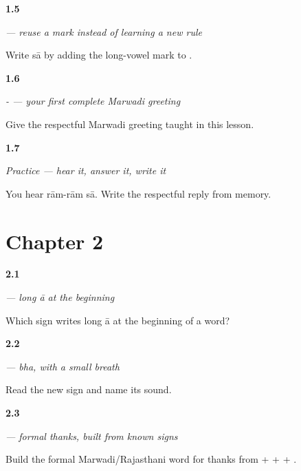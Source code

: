 \noindent\begin{minipage}[t]{\linewidth}
\raggedright
\hypertarget{review-MW-W01-saa-build}{\textbf{1.5}} \emph{ — reuse a mark instead of learning a new rule}\par
\small Write sā by adding the long-vowel mark to .
\end{minipage}\par\medskip

\noindent\begin{minipage}[t]{\linewidth}
\raggedright
\hypertarget{review-MW-C01-raam-raam-saa-greeting-cue}{\textbf{1.6}} \emph{-  — your first complete Marwadi greeting}\par
\small Give the respectful Marwadi greeting taught in this lesson.
\end{minipage}\par\medskip

\noindent\begin{minipage}[t]{\linewidth}
\raggedright
\hypertarget{review-MW-C01-practice-answer}{\textbf{1.7}} \emph{Practice — hear it, answer it, write it}\par
\small You hear rām-rām sā. Write the respectful reply from memory.
\end{minipage}\par\medskip

\section*{Chapter 2}

\noindent\begin{minipage}[t]{\linewidth}
\raggedright
\hypertarget{review-MW-W02-aa-independent-choice}{\textbf{2.1}} \emph{ — long \emph{ā} at the beginning}\par
\small Which sign writes long ā at the beginning of a word?
\end{minipage}\par\medskip

\noindent\begin{minipage}[t]{\linewidth}
\raggedright
\hypertarget{review-MW-W02-bha-sound}{\textbf{2.2}} \emph{ — \emph{bha}, with a small breath}\par
\small Read the new sign  and name its sound.
\end{minipage}\par\medskip

\noindent\begin{minipage}[t]{\linewidth}
\raggedright
\hypertarget{review-MW-C02-aabhaar-build}{\textbf{2.3}} \emph{ — formal thanks, built from known signs}\par
\small Build the formal Marwadi/Rajasthani word for thanks from  +  +  + .
\end{minipage}\par\medskip

